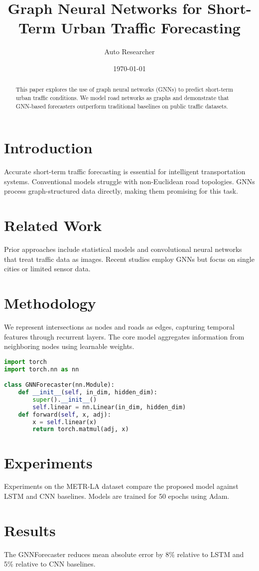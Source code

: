 \documentclass{article}
\title{Graph Neural Networks for Short-Term Urban Traffic Forecasting}
\author{Auto Researcher}
\date{\today}
\begin{document}
\maketitle
\begin{abstract}
This paper explores the use of graph neural networks (GNNs) to predict short-term urban traffic conditions. We model road networks as graphs and demonstrate that GNN-based forecasters outperform traditional baselines on public traffic datasets.
\end{abstract}
\section{Introduction}
Accurate short-term traffic forecasting is essential for intelligent transportation systems. Conventional models struggle with non-Euclidean road topologies. GNNs process graph-structured data directly, making them promising for this task.
\section{Related Work}
Prior approaches include statistical models and convolutional neural networks that treat traffic data as images. Recent studies employ GNNs but focus on single cities or limited sensor data.
\section{Methodology}
We represent intersections as nodes and roads as edges, capturing temporal features through recurrent layers. The core model aggregates information from neighboring nodes using learnable weights.
\begin{lstlisting}[language=Python]
import torch
import torch.nn as nn

class GNNForecaster(nn.Module):
    def __init__(self, in_dim, hidden_dim):
        super().__init__()
        self.linear = nn.Linear(in_dim, hidden_dim)
    def forward(self, x, adj):
        x = self.linear(x)
        return torch.matmul(adj, x)
\end{lstlisting}
\section{Experiments}
Experiments on the METR-LA dataset compare the proposed model against LSTM and CNN baselines. Models are trained for 50 epochs using Adam.
\section{Results}
The GNNForecaster reduces mean absolute error by 8\% relative to LSTM and 5\% relative to CNN baselines.
\end{document}
